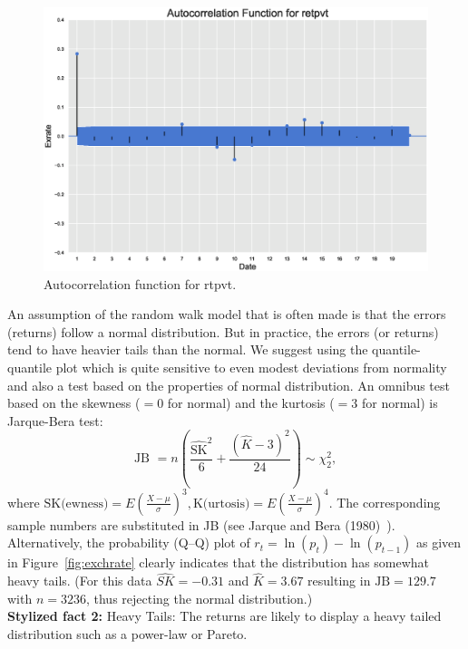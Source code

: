 	\begin{figure}[!ht]
	\centering
	\includegraphics[width=\textwidth]{chapters/chapter_uvts/figures/Sec2-4Fig5.eps}
	\caption{Autocorrelation function for rtpvt. \label{fig:autocorrtpvt}}
	\end{figure}
An assumption of the random walk model that is often made is that the errors (returns)
follow a normal distribution. But in practice, the errors (or returns) tend to have heavier tails than the normal. We suggest using the quantile-quantile plot which is quite sensitive to even modest deviations from normality and also a test based on the properties of normal distribution. An omnibus test based on the skewness ($=0$ for normal) and the kurtosis ($=3$ for normal) is Jarque-Bera test:
	\begin{equation} \label{eqn:2JB}
	\text{JB }= n \left( \frac{\widehat{\text{SK}}^2}{6} + \frac{(\hat{K} - 3)^2}{24} \right) \sim \chi_2^2,
	\end{equation}
where $\text{SK} \text{(ewness)}= E( \frac{X-\mu}{\sigma} )^3, \text{K} \text{(urtosis)} = E( \frac{X-\mu}{\sigma} )^4$. The corresponding sample numbers are substituted in JB (see Jarque and Bera (1980)~\cite{jarque80}). Alternatively, the probability (Q--Q) plot of $r_t = \ln{(p_t)} - \ln{(p_{t-1})}$ as given in Figure~\ref{fig:exchrate} clearly indicates that the distribution has somewhat heavy tails. (For this data $\widehat{SK} = -0.31$ and $\hat{K} = 3.67$ resulting in $\text{JB}= 129.7$ with $n= 3236$, thus rejecting the normal distribution.) \\


\noindent\textbf{Stylized fact 2:} Heavy Tails: The returns are likely to display a heavy
tailed distribution such as a power-law or Pareto. \\


